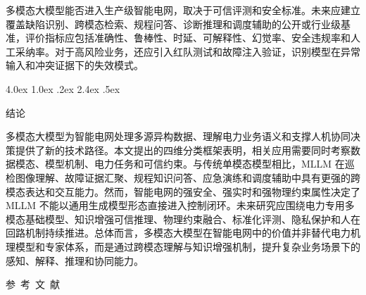 \documentclass[10.5pt,compsoc]{CjC}
\makeatletter
\renewcommand\section{\@startsection {section}{1}{\z@}%
  {4.0ex \@plus 1.0ex \@minus .2ex}%
  {2.4ex \@plus .5ex}%
  {\normalfont\zihao{4-}\heiti\bfseries\raggedright}}
\theoremstyle{mystyle}
\makeatother
\begin{document}
多模态大模型能否进入生产级智能电网，取决于可信评测和安全标准。未来应建立覆盖缺陷识别、跨模态检索、规程问答、诊断推理和调度辅助的公开或行业级基准，评价指标应包括准确性、鲁棒性、时延、可解释性、幻觉率、安全违规率和人工采纳率。对于高风险业务，还应引入红队测试和故障注入验证，识别模型在异常输入和冲突证据下的失效模式\cite{li2024risks,ghafari2025comprehensive,mirshekali2025review}。


\section{结论}

多模态大模型为智能电网处理多源异构数据、理解电力业务语义和支撑人机协同决策提供了新的技术路径。本文提出的四维分类框架表明，相关应用需要同时考察数据模态、模型机制、电力任务和可信约束。与传统单模态模型相比，MLLM 在巡检图像理解、故障证据汇聚、规程知识问答、应急演练和调度辅助中具有更强的跨模态表达和交互能力。然而，智能电网的强安全、强实时和强物理约束属性决定了 MLLM 不能以通用生成模型形态直接进入控制闭环。未来研究应围绕电力专用多模态基础模型、知识增强可信推理、物理约束融合、标准化评测、隐私保护和人在回路机制持续推进。总体而言，多模态大模型在智能电网中的价值并非替代电力机理模型和专家体系，而是通过跨模态理解与知识增强机制，提升复杂业务场景下的感知、解释、推理和协同能力。

\vspace {5mm}
\centerline
{
\heiti 参~考~文~献}

\begingroup
\renewcommand{\refname}{}


\endgroup
\end{document}
